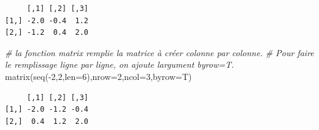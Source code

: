 \documentclass[
  8pt,
  ignorenonframetext,
]{beamer}
\newenvironment{Shaded}{\begin{snugshade}}{\end{snugshade}}
\newcommand{\AttributeTok}[1]{\textcolor[rgb]{0.77,0.63,0.00}{#1}}
\newcommand{\CommentTok}[1]{\textcolor[rgb]{0.56,0.35,0.01}{\textit{#1}}}
\newcommand{\DecValTok}[1]{\textcolor[rgb]{0.00,0.00,0.81}{#1}}
\newcommand{\FunctionTok}[1]{\textcolor[rgb]{0.00,0.00,0.00}{#1}}
\newcommand{\NormalTok}[1]{#1}
\newcommand{\SpecialCharTok}[1]{\textcolor[rgb]{0.00,0.00,0.00}{#1}}
\begin{document}
\begin{frame}[fragile]{}
\begin{verbatim}
     [,1] [,2] [,3]
[1,] -2.0 -0.4  1.2
[2,] -1.2  0.4  2.0
\end{verbatim}

\begin{Shaded}
\begin{Highlighting}[]
\CommentTok{\# la fonction matrix remplie la matrice à créer colonne par colonne.}
\CommentTok{\# Pour faire le remplissage ligne par ligne, on ajoute l\textquotesingle{}argument byrow=T.}
\FunctionTok{matrix}\NormalTok{(}\FunctionTok{seq}\NormalTok{(}\SpecialCharTok{{-}}\DecValTok{2}\NormalTok{,}\DecValTok{2}\NormalTok{,}\AttributeTok{len=}\DecValTok{6}\NormalTok{),}\AttributeTok{nrow=}\DecValTok{2}\NormalTok{,}\AttributeTok{ncol=}\DecValTok{3}\NormalTok{,}\AttributeTok{byrow=}\NormalTok{T)}
\end{Highlighting}
\end{Shaded}

\begin{verbatim}
     [,1] [,2] [,3]
[1,] -2.0 -1.2 -0.4
[2,]  0.4  1.2  2.0
\end{verbatim}
\end{frame}
\end{document}
